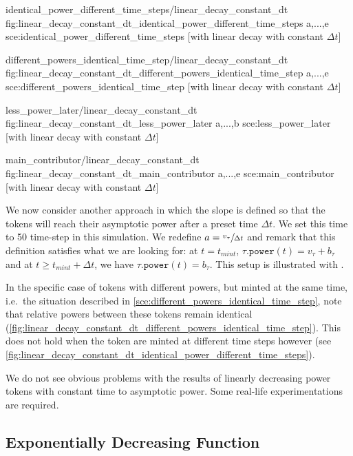 \printPowerFunctionGraphs%
  {identical_power_different_time_steps/linear_decay_constant_dt}
  {fig:linear_decay_constant_dt_identical_power_different_time_steps}
  {a,...,e}
  {sce:identical_power_different_time_steps}
  [with linear decay with constant $\Delta t$]

\printPowerFunctionGraphs%
  {different_powers_identical_time_step/linear_decay_constant_dt}
  {fig:linear_decay_constant_dt_different_powers_identical_time_step}
  {a,...,e}
  {sce:different_powers_identical_time_step}
  [with linear decay with constant $\Delta t$]

\printPowerFunctionGraphs%
  {less_power_later/linear_decay_constant_dt}
  {fig:linear_decay_constant_dt_less_power_later}
  {a,...,b}
  {sce:less_power_later}
  [with linear decay with constant $\Delta t$]

\printPowerFunctionGraphs%
  {main_contributor/linear_decay_constant_dt}
  {fig:linear_decay_constant_dt_main_contributor}
  {a,...,e}
  {sce:main_contributor}
  [with linear decay with constant $\Delta t$]

We now consider another approach in which the slope is defined so that the tokens will reach their asymptotic power after a preset time $\Delta t$.
We set this time to 50 time-step in this simulation.
We redefine $a=\sfrac{v_\tau}{\Delta t}$ and remark that this definition satisfies what we are looking for: at $t = t_{mint}$, $\tau\mathtt{.power}(t) = v_\tau + b_\tau$ and at $t \ge t_{mint} + \Delta t$, we have $\tau\mathtt{.power}(t) = b_\tau$.
This setup is illustrated with .%

In the specific case of tokens with different powers, but minted at the same time, i.e.\ the situation described in \cref{sce:different_powers_identical_time_step}, note that relative powers between these tokens remain identical (\cref{fig:linear_decay_constant_dt_different_powers_identical_time_step}).
This does not hold when the token are minted at different time steps however (see \cref{fig:linear_decay_constant_dt_identical_power_different_time_steps}).

We do not see obvious problems with the results of linearly decreasing power tokens with constant time to asymptotic power.
Some real-life experimentations are required.

\subsection{Exponentially Decreasing Function}


